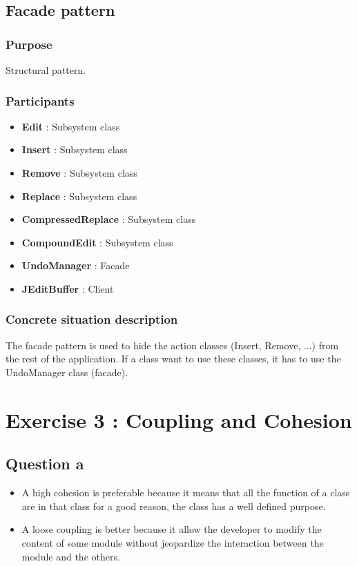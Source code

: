 \documentclass[a4paper,10pt]{article}
\begin{document}
\subsection{Facade pattern}
\subsubsection{Purpose}
Structural pattern.
\subsubsection[Participants]{Participants\footnotemark[1]}
\begin{itemize}
 \item \textbf{Edit} : Subsystem class
 \item \textbf{Insert} : Subsystem class
 \item \textbf{Remove} : Subsystem class
 \item \textbf{Replace} : Subsystem class
 \item \textbf{CompressedReplace} : Subsystem class
 \item \textbf{CompoundEdit} : Subsystem class
 \item \textbf{UndoManager} : Facade
 \item \textbf{JEditBuffer} : Client
\end{itemize}

\subsubsection{Concrete situation description}
The facade pattern is used to hide the action classes (Insert, Remove, ...) from the rest of the application. If a class want to use these classes, it has to use the UndoManager class (facade).

\section{Exercise 3 : Coupling and Cohesion}
\subsection{Question a}
\begin{itemize}
\item A high cohesion is preferable because it means that all the function of a class are in that class for a good reason, the class has a well defined purpose.
\item A loose coupling is better because it allow the developer to modify the content of some module without jeopardize the interaction between the module and the others.
\end{itemize}
\end{document}
